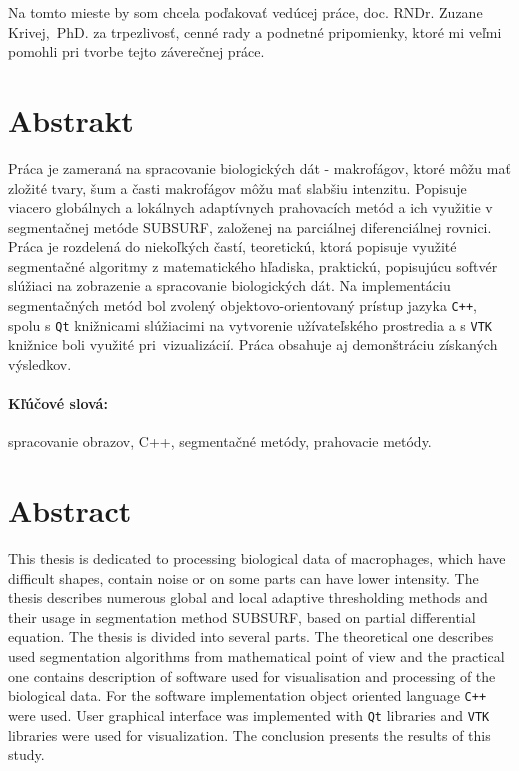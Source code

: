 \documentclass[a4paper,11pt,oneside]{article}%
\begin{document}
Na tomto mieste by som chcela poďakovať vedúcej práce, doc. RNDr. Zuzane Krivej,~PhD. za trpezlivosť, cenné rady a podnetné pripomienky, ktoré mi veľmi pomohli pri tvorbe tejto záverečnej práce.

\newpage 
 \thispagestyle{empty}
\section*{Abstrakt}

Práca je zameraná na spracovanie biologických dát - makrofágov, ktoré môžu mať zložité tvary, šum a časti makrofágov môžu mať slabšiu intenzitu. Popisuje viacero globálnych a lokálnych adaptívnych prahovacích metód a ich využitie v segmentačnej metóde SUBSURF, založenej na parciálnej diferenciálnej rovnici. Práca je rozdelená do niekoľkých častí, teoretickú, ktorá popisuje využité segmentačné algoritmy z matematického hľadiska, praktickú, popisujúcu softvér slúžiaci na zobrazenie a spracovanie biologických dát. Na implementáciu segmentačných metód bol zvolený objektovo-orientovaný prístup jazyka \texttt{C++}, spolu s \texttt{Qt} knižnicami slúžiacimi na vytvorenie užívateľského prostredia a s \texttt{VTK} knižnice boli využité pri~vizualizácií. Práca obsahuje aj demonštráciu získaných výsledkov.


\paragraph*{Kľúčové slová:}spracovanie obrazov, C++, segmentačné metódy, prahovacie metódy.

\section*{Abstract}

This thesis is dedicated to processing biological data of macrophages, which have difficult shapes, contain noise or on some parts can have lower intensity. The thesis describes numerous global and local adaptive thresholding methods and their usage in segmentation method SUBSURF, based on partial differential equation. The thesis is divided into several parts. The theoretical one describes used segmentation algorithms from mathematical point of view and the practical one contains description of software used for visualisation and processing of the biological data. For the software implementation object oriented language \texttt{C++} were used. User graphical interface was implemented with \texttt{Qt} libraries and \texttt{VTK} libraries were used for visualization. The conclusion presents the results of this study.
\end{document}
